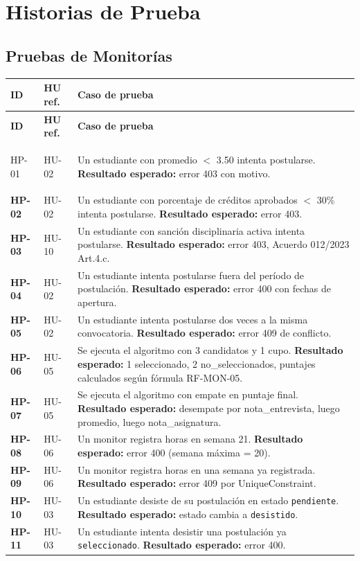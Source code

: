 \documentclass[12pt,a4paper]{article}
\begin{document}
\newpage
\section{Historias de Prueba}

\subsection{Pruebas de Monitorías}

\begin{longtable}{>{\bfseries}p{1.2cm} p{2.5cm} p{9.5cm}}
  \toprule
  \textbf{ID} & \textbf{HU ref.} & \textbf{Caso de prueba} \\
  \midrule
  \endfirsthead
  \toprule \textbf{ID} & \textbf{HU ref.} & \textbf{Caso de prueba} \\ \midrule
  \endhead

  HP-01 & HU-02 & Un estudiante con promedio $<$ 3.50 intenta postularse. \textbf{Resultado esperado:} error 403 con motivo. \\[3pt]
  HP-02 & HU-02 & Un estudiante con porcentaje de créditos aprobados $<$ 30\% intenta postularse. \textbf{Resultado esperado:} error 403. \\[3pt]
  HP-03 & HU-10 & Un estudiante con sanción disciplinaria activa intenta postularse. \textbf{Resultado esperado:} error 403, Acuerdo 012/2023 Art.4.c. \\[3pt]
  HP-04 & HU-02 & Un estudiante intenta postularse fuera del período de postulación. \textbf{Resultado esperado:} error 400 con fechas de apertura. \\[3pt]
  HP-05 & HU-02 & Un estudiante intenta postularse dos veces a la misma convocatoria. \textbf{Resultado esperado:} error 409 de conflicto. \\[3pt]
  HP-06 & HU-05 & Se ejecuta el algoritmo con 3 candidatos y 1 cupo. \textbf{Resultado esperado:} 1 seleccionado, 2 no\_seleccionados, puntajes calculados según fórmula RF-MON-05. \\[3pt]
  HP-07 & HU-05 & Se ejecuta el algoritmo con empate en puntaje final. \textbf{Resultado esperado:} desempate por nota\_entrevista, luego promedio, luego nota\_asignatura. \\[3pt]
  HP-08 & HU-06 & Un monitor registra horas en semana 21. \textbf{Resultado esperado:} error 400 (semana máxima = 20). \\[3pt]
  HP-09 & HU-06 & Un monitor registra horas en una semana ya registrada. \textbf{Resultado esperado:} error 409 por UniqueConstraint. \\[3pt]
  HP-10 & HU-03 & Un estudiante desiste de su postulación en estado \texttt{pendiente}. \textbf{Resultado esperado:} estado cambia a \texttt{desistido}. \\[3pt]
  HP-11 & HU-03 & Un estudiante intenta desistir una postulación ya \texttt{seleccionado}. \textbf{Resultado esperado:} error 400. \\

  \bottomrule
\end{longtable}
\end{document}
